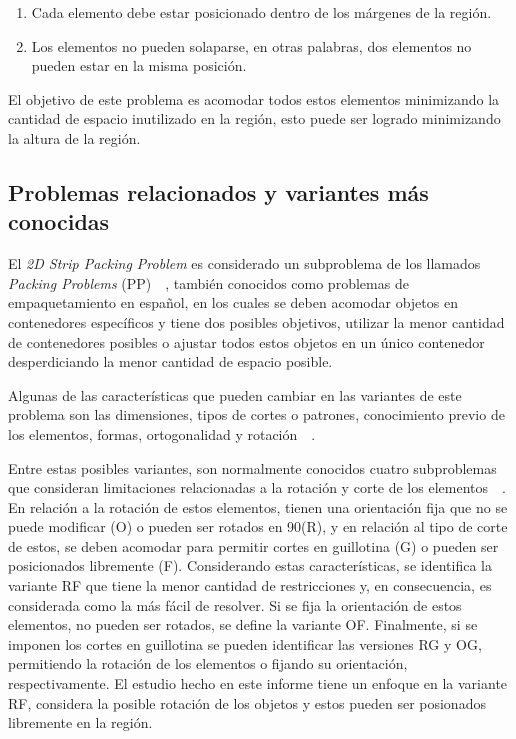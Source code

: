 \documentclass[letter, 10pt]{article}
\begin{document}
\begin{enumerate}
    \item Cada elemento debe estar posicionado dentro de los m\'argenes de la regi\'on.
    \item Los elementos no pueden solaparse, en otras palabras, dos elementos no pueden estar en la misma posici\'on.
\end{enumerate}

El objetivo de este problema es acomodar todos estos elementos minimizando la cantidad de espacio inutilizado en la regi\'on, esto puede ser logrado minimizando la altura de la regi\'on.

\subsection{Problemas relacionados y variantes m\'as conocidas}

El \emph{2D Strip Packing Problem} es considerado un subproblema de los llamados \emph{Packing Problems} (PP)~\cite{babaouglu2017solving}~\cite{lodi2002two}, tambi\'en conocidos como problemas de empaquetamiento en espa\~nol, en los cuales se deben acomodar objetos en contenedores espec\'ificos y tiene dos posibles objetivos, utilizar la menor cantidad de contenedores posibles o ajustar todos estos objetos en un \'unico contenedor desperdiciando la menor cantidad de espacio posible.

Algunas de las caracter\'isticas que pueden cambiar en las variantes de este problema son las dimensiones, tipos de cortes o patrones, conocimiento previo de los elementos, formas, ortogonalidad y rotaci\'on~\cite{junior2022rectangular}~\cite{oliveira2016survey}.

Entre estas posibles variantes, son normalmente conocidos cuatro subproblemas que consideran limitaciones relacionadas a la rotaci\'on y corte de los elementos~\cite{junior2022rectangular}~\cite{lodi2002two}. En relaci\'on a la rotaci\'on de estos elementos, tienen una orientaci\'on fija que no se puede modificar (O) o pueden ser rotados en 90\textdegree \hspace{2pt}(R), y en relaci\'on al tipo de corte de estos, se deben acomodar para permitir cortes en guillotina (G) o pueden ser posicionados libremente (F). Considerando estas caracter\'isticas, se identifica la variante RF que tiene la menor cantidad de restricciones y, en consecuencia, es considerada como la m\'as f\'acil de resolver. Si se fija la orientaci\'on de estos elementos, no pueden ser rotados, se define la variante OF. Finalmente, si se imponen los cortes en guillotina se pueden identificar las versiones RG y OG, permitiendo la rotaci\'on de los elementos o fijando su orientaci\'on, respectivamente. El estudio hecho en este informe tiene un enfoque en la variante RF, considera la posible rotaci\'on de los objetos y estos pueden ser posionados libremente en la regi\'on.
\end{document}
